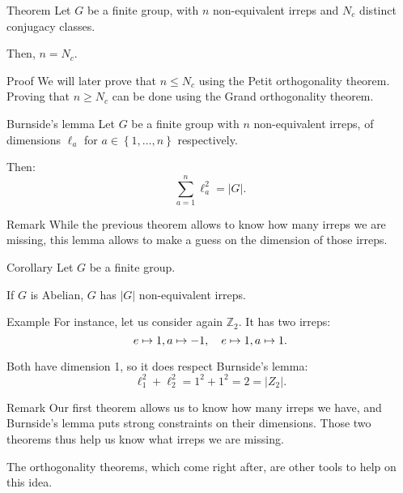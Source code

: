\documentclass[a4paper]{article}
\begin{document}
\begin{parag}{Theorem}
    Let $G$ be a finite group, with $n$ non-equivalent irreps and $N_c$ distinct conjugacy classes.

    Then, $n = N_c$.

    \begin{subparag}{Proof}
        We will later prove that $n \leq N_c$ using the Petit orthogonality theorem. Proving that $n \geq N_c$ can be done using the Grand orthogonality theorem.
    \end{subparag}
\end{parag}

\begin{parag}{Burnside's lemma}
    Let $G$ be a finite group with $n$ non-equivalent irreps, of dimensions $\ell_a$ for $a \in \left\{1, \ldots, n\right\}$ respectively.

    Then: 
    \[\sum_{a=1}^{n} \ell_a^2 = \left|G\right|.\]

    \begin{subparag}{Remark}
        While the previous theorem allows to know how many irreps we are missing, this lemma allows to make a guess on the dimension of those irreps.
    \end{subparag}
\end{parag}

\begin{parag}{Corollary}
    Let $G$ be a finite group.

    If $G$ is Abelian, $G$ has $\left|G\right|$ non-equivalent irreps.
\end{parag}

\begin{parag}{Example}
    For instance, let us consider again $\mathbb{Z}_2$. It has two irreps: 
    \[e \mapsto 1, a \mapsto -1, \quad e \mapsto 1, a \mapsto 1.\]
    
    Both have dimension 1, so it does respect Burnside's lemma: 
    \[\ell_1^2 + \ell_2^2 = 1^2 + 1^2 = 2 = \left|Z_2\right|.\]
\end{parag}

\begin{parag}{Remark}
    Our first theorem allows us to know how many irreps we have, and Burnside's lemma puts strong constraints on their dimensions. Those two theorems thus help us know what irreps we are missing.

    The orthogonality theorems, which come right after, are other tools to help on this idea.
\end{parag}
\end{document}
